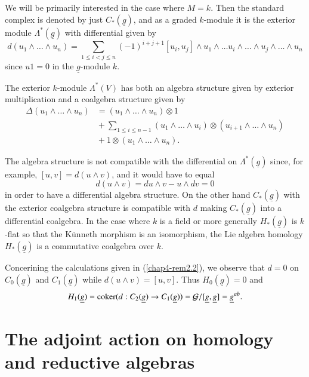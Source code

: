 We will be primarily interested in the case where $M=k$. Then the
standard complex is denoted by just $C_{\ast}(\underline{g})$, and as
a graded $k$-module it is the exterior module
$\Lambda^{*}(\underline{g})$ with differential given by
$$
d(u_{1}\wedge\ldots\wedge u_{n})=\sum_{1\leq i<j\leq
  n}(-1)^{i+j+1}[u_{i},u_{j}]\wedge u_{1}\wedge\ldots
u_{i}\wedge\ldots\wedge u_{j}\wedge\ldots\wedge u_{n}
$$
since $u1=0$ in the $\underline{g}$-module $k$.

\begin{remark}\label{chap4-rem2.4}
The exterior $k$-module $\Lambda^{*}(V)$ has both an algebra structure
given by exterior multiplication and a coalgebra structure given by
\begin{align*}
\Delta (u_{1}\wedge\ldots\wedge u_{n}) &= (u_{1}\wedge\ldots\wedge
u_{n})\otimes 1\\
& {}+\sum\limits_{1\leq i\leq n-1}(u_{1}\wedge\ldots\wedge
u_{i})\otimes (u_{i+1}\wedge\ldots\wedge u_{n})\\
&{} + 1\otimes (u_{1}\wedge\ldots\wedge u_{n}).
\end{align*}

The algebra structure is not compatible with the differential on
$\Lambda^{*}(\underline{g})$ since, for example, $[u,v]=d(u\wedge v)$,
and it would have to equal
$$
d(u\wedge v)=du\wedge v-u\wedge dv=0
$$
in order to have a differential algebra structure. On the other hand
$C_{\ast}(\underline{g})$ with the exterior coalgebra structure is
compatible with $d$ making $C_{\ast}(\underline{g})$ into a
differential coalgebra. In the case where $k$ is a field or more
generally $H_{\ast}(\underline{g})$ is $k$-flat so that the K\"unneth
morphism is an isomorphism, the Lie algebra homology
$H_{\ast}(\underline{g})$ is a commutative coalgebra over $k$.

Concerining the calculations given in (\ref{chap4-rem2.2}), we observe
that $d=0$ on $C_{0}(\underline{g})$ and $C_{1}(\underline{g})$ while
$d(u\wedge v)=[u,v]$. Thus $H_{0}(\underline{g})=0$ and
$$
H_{1}(\underline{g})=\operatorname{coker}(d:C_{2}(\underline{g})\to
C_{1}(\underline{g}))=\mathcal{G}/[\underline{g},\underline{g}]=\underline{g}^{ab}.
$$
\end{remark}

\section{The adjoint action on homology and reductive
  algebras}\label{chap4-sec3}\pageoriginale{}

